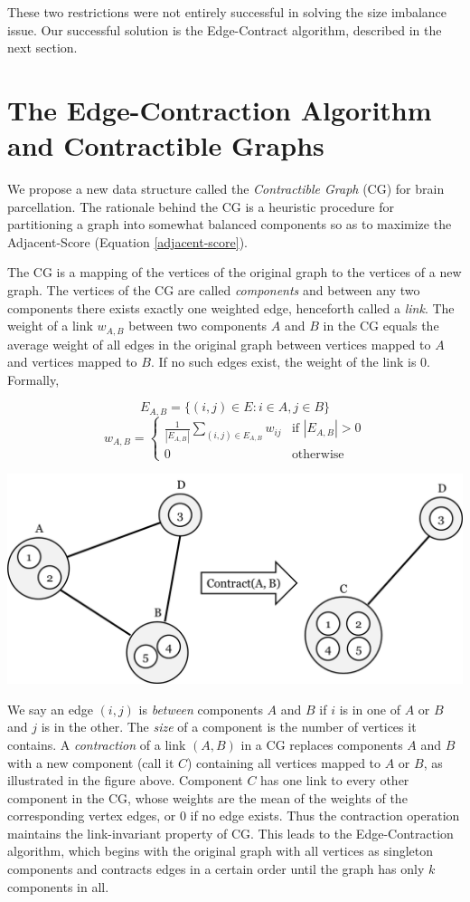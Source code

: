 These two restrictions were not entirely successful in solving the size
imbalance issue. Our successful solution is the Edge-Contract algorithm,
described in the next section.

\section{The Edge-Contraction Algorithm and Contractible Graphs}

We propose a new data structure called the \textit{Contractible Graph}
(CG) for brain parcellation. The rationale behind the CG is a heuristic
procedure for partitioning a graph into somewhat balanced components
so as to maximize the Adjacent-Score (Equation \ref{adjacent-score}).

The CG is a mapping of the vertices of the original graph to the
vertices of a new graph. The vertices of the CG are called
\textit{components} and between any two components there exists exactly
one weighted edge, henceforth called a \textit{link}. The weight
of a link $w_{A,B}$ between two components $A$ and $B$ in the CG equals
the average weight of all edges in the original graph between vertices
mapped to $A$ and vertices mapped to $B$. If no such edges exist,
the weight of the link is $0$. Formally,

\[ E_{A,B} = \{(i, j) \in E : i \in A, j \in B\} \]
\[ w_{A,B} = \begin{cases}
    \frac{1}{|E_{A,B}|} \sum_{(i,j) \in E_{A,B}} w_{ij} &
        \text{if } |E_{A,B}| > 0 \\
    0 & \text{otherwise}
\end{cases} \]

\includegraphics[scale = 0.55]{figs/4_contractible_graph}

We say an edge $(i,j)$ is \textit{between} components $A$ and $B$ if
$i$ is in one of $A$ or $B$ and $j$ is in the other. The \textit{size}
of a component is the number of vertices it contains.
A \textit{contraction} of a link $(A,B)$ in a CG replaces components
$A$ and $B$ with a new component (call it $C$) containing all vertices
mapped to $A$ or $B$, as illustrated in the figure above.
Component $C$ has one link to every other component in the CG, whose
weights are the mean of the weights of the corresponding vertex edges,
or $0$ if no edge exists. Thus the contraction operation maintains the
link-invariant property of CG. This leads to the Edge-Contraction
algorithm, which begins with the original graph with all vertices as
singleton components and contracts edges in a certain order until the
graph has only $k$ components in all.

